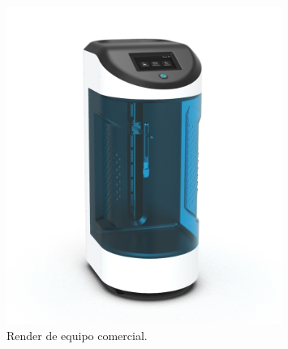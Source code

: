 \begin{itemize}
\begin{figure}[h!]
	\centering
	\includegraphics[width=0.8\textwidth]{./Figures/new_dip.png}
	\caption{Render de equipo comercial\protect\footnotemark.}
	\label{fig:new_dip}
\end{figure}


\end{itemize}


